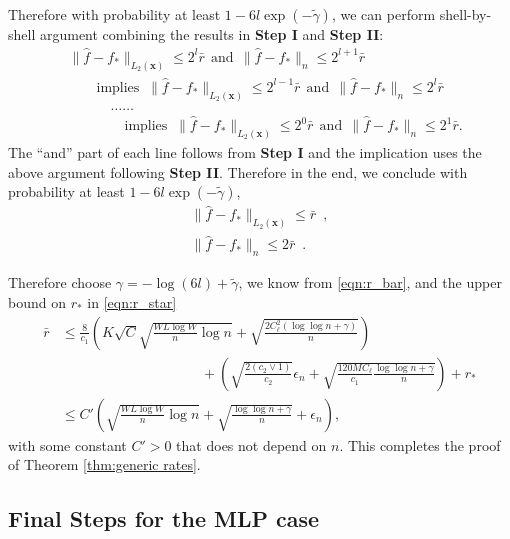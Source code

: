 \documentclass[11pt]{article}
\numberwithin{equation}{section}
\theoremstyle{definition}
\newcommand{\bx}{\bm{x}}
\newcommand{\gt}{\tilde{\gamma}}
\begin{document}
\begin{appendices}
Therefore with probability at least $1 - 6l \exp(-\gt)$, we can perform shell-by-shell argument combining the results in {\bf Step I} and {\bf Step II}:
\begin{align*}
	& \| \hat{f} - f_* \|_{L_2(\bx)} \leq 2^{l} \bar{r} ~~\text{and}~~ \| \hat{f} - f_* \|_n \leq 2^{l+1} \bar{r} \\
	& \qquad \text{implies } \ \| \hat{f} - f_* \|_{L_2(\bx)} \leq 2^{l-1} \bar{r} ~~\text{and}~~ \| \hat{f} - f_* \|_n \leq 2^{l}  \bar{r} \\
	& \qquad\quad \ldots \ldots \\
	& \qquad\qquad  \text{implies } \ \| \hat{f} - f_* \|_{L_2(\bx)} \leq  2^0 \bar{r} ~~\text{and}~~ \| \hat{f} - f_* \|_n \leq 2^1 \bar{r}.
\end{align*}
The ``and'' part of each line follows from {\bf Step I} and the implication uses the above argument following {\bf Step II}. Therefore in the end, we conclude with probability at least $1 - 6l \exp(-\gt)$, %
\begin{align}
\| \hat{f} - f_* \|_{L_2(\bx)} \leq  \bar{r} \enspace, \\
\| \hat{f} - f_* \|_n \leq 2 \bar{r} \enspace.	
\end{align}


Therefore choose $\gamma = - \log (6l) + \gt$, we know from \eqref{eqn:r_bar}, and the upper bound on $r_*$ in \eqref{eqn:r_star}
\begin{align}
	\bar{r} &\leq \frac{8}{c_1}  \left( K\sqrt{C} \sqrt{ \frac{W L \log W}{n}\log n}  + \sqrt{\frac{2 C_\ell^2 (\log \log n + \gamma)}{n}} \right)    		\nonumber \\
	& \qquad\qquad\qquad\qquad\qquad + \left( \sqrt{\frac{2(c_2 \vee 1)}{c_2}} \epsilon_n + \sqrt{\frac{120 M C_\ell}{c_1} \frac{\log \log n + \gamma}{n}} \right) + r_* \nonumber \\
	& \leq C' \left( \sqrt{ \frac{W L \log W}{n}\log n} + \sqrt{\frac{\log \log n + \gamma}{n}} + \epsilon_n  \right),  		\label{eqn:balance}
\end{align} 
with some constant $C' > 0$ that does not depend on $n$. This completes the proof of Theorem \ref{thm:generic rates}. 






\subsection{Final Steps for the MLP case}
	\label{appx:mlp-last-steps}
	

\end{appendices}
\end{document}
